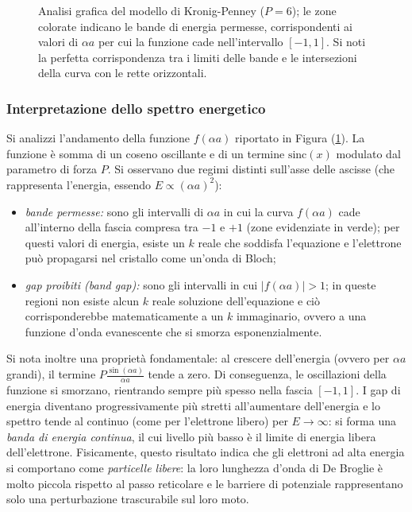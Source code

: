 \documentclass[a4paper,11pt]{report}
\begin{document}
\begin{figure}[H]
    \caption{Analisi grafica del modello di Kronig-Penney ($P=6$); le zone colorate indicano le bande di energia permesse, corrispondenti ai valori di $\alpha a$ per cui la funzione cade nell'intervallo $[-1, 1]$. Si noti la perfetta corrispondenza tra i limiti delle bande e le intersezioni della curva con le rette orizzontali.}
    \label{fig:kp_plot_revised}
\end{figure}

\subsubsection{Interpretazione dello spettro energetico}
Si analizzi l'andamento della funzione $f(\alpha a)$ riportato in Figura (\ref{fig:kp_plot_revised}).
La funzione è somma di un coseno oscillante e di un termine $\text{sinc}(x)$ modulato dal parametro di forza $P$.
Si osservano due regimi distinti sull'asse delle ascisse (che rappresenta l'energia, essendo $E \propto (\alpha a)^2$):

\begin{itemize}
    \item \textit{bande permesse:} sono gli intervalli di $\alpha a$ in cui la curva $f(\alpha a)$ cade all'interno della fascia compresa tra $-1$ e $+1$ (zone evidenziate in verde); per questi valori di energia, esiste un $k$ reale che soddisfa l'equazione e l'elettrone può propagarsi nel cristallo come un'onda di Bloch;
    
    \item \textit{gap proibiti (band gap):} sono gli intervalli in cui $|f(\alpha a)| > 1$; in queste regioni non esiste alcun $k$ reale soluzione dell'equazione e ciò corrisponderebbe matematicamente a un $k$ immaginario, ovvero a una funzione d'onda evanescente che si smorza esponenzialmente.
\end{itemize}
Si nota inoltre una proprietà fondamentale: al crescere dell'energia (ovvero per $\alpha a$ grandi), il termine $P \frac{\sin(\alpha a)}{\alpha a}$ tende a zero. Di conseguenza, le oscillazioni della funzione si smorzano, rientrando sempre più spesso nella fascia $[-1, 1]$.
I gap di energia diventano progressivamente più stretti all'aumentare dell'energia e lo spettro tende al continuo (come per l'elettrone libero) per $E \to \infty$: si forma una \textit{banda di energia continua}, il cui livello più basso è il limite di energia libera dell'elettrone. Fisicamente, questo risultato indica che gli elettroni ad alta energia si comportano come \textit{particelle libere}: la loro lunghezza d'onda di De Broglie è molto piccola rispetto al passo reticolare e le barriere di potenziale rappresentano solo una perturbazione trascurabile sul loro moto. 
\end{document}
